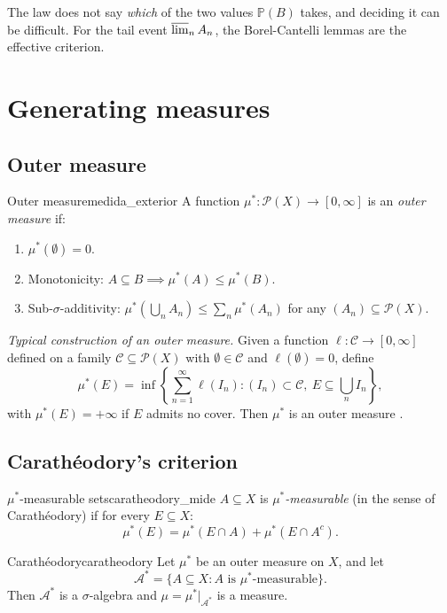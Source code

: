 \documentclass[11pt, a4paper]{article}
\begin{document}
\obs The law does not say \emph{which} of the two values $\mathbb{P}(B)$ takes, and deciding it can be
difficult. For the tail event $\varlimsup_n A_n$, the Borel-Cantelli lemmas are the
effective criterion.

\newpage

\section{Generating measures}

\subsection{Outer measure}

\begin{definicion}{Outer measure}{medida_exterior}
A function $\mu^*: \mathcal{P}(X) \to [0, \infty]$ is an \emph{outer measure} if:
\begin{enumerate}
    \item $\mu^*(\emptyset) = 0$.
    \item Monotonicity: $A \subseteq B \implies \mu^*(A) \le \mu^*(B)$.
    \item Sub-$\sigma$-additivity: $\mu^*(\bigcup_n A_n) \le \sum_n \mu^*(A_n)$ for any
    $(A_n) \subseteq \mathcal{P}(X)$.
\end{enumerate}
\end{definicion}

\obs \emph{Typical construction of an outer measure.} Given a function $\ell:
\mathcal{C} \to [0, \infty]$ defined on a family $\mathcal{C} \subseteq \mathcal{P}(X)$
with $\emptyset \in \mathcal{C}$ and $\ell(\emptyset) = 0$, define
$$ \mu^*(E) = \inf\left\{ \sum_{n=1}^\infty \ell(I_n) : (I_n) \subset \mathcal{C}, \ E \subseteq
\bigcup_n I_n \right\}, $$
with $\mu^*(E) = +\infty$ if $E$ admits no cover. Then $\mu^*$ is an outer measure
.

\subsection{Carathéodory's criterion}

\begin{definicion}{$\mu^*$-measurable sets}{caratheodory_mide}
$A \subseteq X$ is \emph{$\mu^*$-measurable} (in the sense of Carathéodory) if for every
$E \subseteq X$:
$$ \mu^*(E) = \mu^*(E \cap A) + \mu^*(E \cap A^c). $$
\end{definicion}

\begin{teorema}{Carathéodory}{caratheodory}
Let $\mu^*$ be an outer measure on $X$, and let
$$ \mathcal{A}^* = \{ A \subseteq X : A \text{ is } \mu^*\text{-measurable} \}. $$
Then $\mathcal{A}^*$ is a $\sigma$-algebra and $\mu = \mu^*|_{\mathcal{A}^*}$ is a measure.
\end{teorema}
\end{document}
